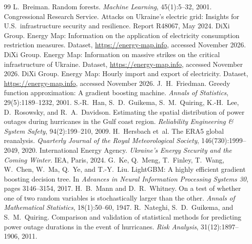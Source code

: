 \documentclass[9pt,twocolumn,letterpaper]{extarticle}
\begin{document}
\renewcommand{\refname}{REFERENCES}
\renewcommand{\section}[2]{\vspace{0.6ex}\noindent{\normalsize\bfseries #2}\par\vspace{0.3ex}}
\small
\begin{thebibliography}{99}\setlength{\itemsep}{1pt}
 L.~Breiman. Random forests. \emph{Machine Learning}, 45(1):5--32, 2001.
 Congressional Research Service. Attacks on Ukraine's electric grid: Insights for U.S.\ infrastructure security and resilience. Report R48067, May 2024.
 DiXi Group. Energy Map: Information on the application of electricity consumption restriction measures. Dataset, \url{https://energy-map.info}, accessed November 2026.
 DiXi Group. Energy Map: Information on massive strikes on the critical infrastructure of Ukraine. Dataset, \url{https://energy-map.info}, accessed November 2026.
 DiXi Group. Energy Map: Hourly import and export of electricity. Dataset, \url{https://energy-map.info}, accessed November 2026.
 J.~H.~Friedman. Greedy function approximation: A gradient boosting machine. \emph{Annals of Statistics}, 29(5):1189--1232, 2001.
 S.-R.~Han, S.~D.~Guikema, S.~M.~Quiring, K.-H.~Lee, D.~Rosowsky, and R.~A.~Davidson. Estimating the spatial distribution of power outages during hurricanes in the Gulf coast region. \emph{Reliability Engineering \& System Safety}, 94(2):199--210, 2009.
 H.~Hersbach et~al. The ERA5 global reanalysis. \emph{Quarterly Journal of the Royal Meteorological Society}, 146(730):1999--2049, 2020.
 International Energy Agency. \emph{Ukraine's Energy Security and the Coming Winter}. IEA, Paris, 2024.
 G.~Ke, Q.~Meng, T.~Finley, T.~Wang, W.~Chen, W.~Ma, Q.~Ye, and T.-Y.~Liu. LightGBM: A highly efficient gradient boosting decision tree. In \emph{Advances in Neural Information Processing Systems 30}, pages 3146--3154, 2017.
 H.~B.~Mann and D.~R.~Whitney. On a test of whether one of two random variables is stochastically larger than the other. \emph{Annals of Mathematical Statistics}, 18(1):50--60, 1947.
 R.~Nateghi, S.~D.~Guikema, and S.~M.~Quiring. Comparison and validation of statistical methods for predicting power outage durations in the event of hurricanes. \emph{Risk Analysis}, 31(12):1897--1906, 2011.

\end{thebibliography}
\end{document}
